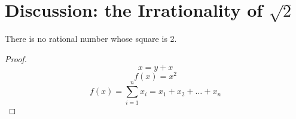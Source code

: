 \section{Discussion: the Irrationality of $\sqrt{2}$}
    \begin{theorem} 
        There is no rational number whose square is 2.
    \end{theorem}
    \begin{proof}
        \begin{equation}
            x = y + x
        \end{equation}
        \begin{equation}
            f(x) = x^2
        \end{equation}
        \begin{equation}
            f(x) = \sum_{i=1}^{n}{x_i} = x_1 + x_2 + \dots + x_n
        \end{equation}
    \end{proof}